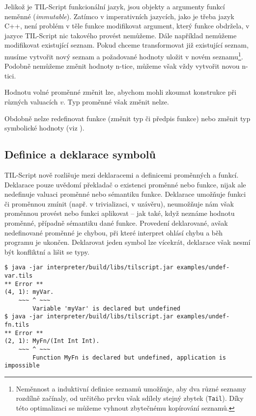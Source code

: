 Jelikož je TIL-Script funkcionální jazyk, jsou objekty a argumenty funkcí neměnné
(\textit{immutable}). Zatímco v imperativních jazycích, jako je třeba jazyk C++, není problém
v těle funkce modifikovat argument, který funkce obdržela, v jazyce TIL-Script nic takového provést
nemůžeme. Dále například nemůžeme modifikovat existující seznam. Pokud chceme transformovat již
existující seznam, musíme vytvořit nový seznam a požadované hodnoty uložit v novém seznamu\footnote{
  Neměnnost a induktivní definice seznamů umožňuje, aby dva různé seznamy rozdílně začínaly, od
  určitého prvku však sdílely stejný zbytek (\lstinline{Tail}). Díky této optimalizaci se můžeme
  vyhnout zbytečnému kopírování seznamů.
}. Podobně nemůžeme změnit hodnoty n-tice, můžeme však vždy vytvořit novou n-tici.

Hodnotu volné proměnné změnit lze, abychom mohli zkoumat konstrukce při různých valuacích $v$.
Typ proměnné však změnit nelze.

Obdobně nelze redefinovat funkce (změnit typ či předpis funkce) nebo změnit typ symbolické hodnoty
(viz ).

\subsection{Definice a deklarace symbolů}

TIL-Script nově rozlišuje mezi deklaracemi a definicemi proměnných a funkcí. Deklarace pouze
uvědomí překladač o existenci proměnné nebo funkce, nijak ale nedefinuje valuaci proměnné nebo
sémantiku funkce. Deklarace umožňuje funkci či proměnnou zmínit (např. v trivializaci, v uzávěru),
neumožňuje nám však proměnnou provést nebo funkci aplikovat -- jak také, když neznáme hodnotu
proměnné, případně sémantiku dané funkce. Provedení deklarované, avšak nedefinované proměnné
je chybou, při které interpret ohlásí chybu a běh programu je ukončen. Deklarovat jeden symbol
lze vícekrát, deklarace však nesmí být konfliktní a lišit se typy.

\begin{lstlisting}[caption={Hlášení chyby při chybějící definici}]
$ java -jar interpreter/build/libs/tilscript.jar examples/undef-var.tils
** Error **
(4, 1): myVar.
    ~~~ ^ ~~~
        Variable 'myVar' is declared but undefined
$ java -jar interpreter/build/libs/tilscript.jar examples/undef-fn.tils
** Error **
(2, 1): MyFn/(Int Int Int).
    ~~~ ^ ~~~
        Function MyFn is declared but undefined, application is impossible
\end{lstlisting}

